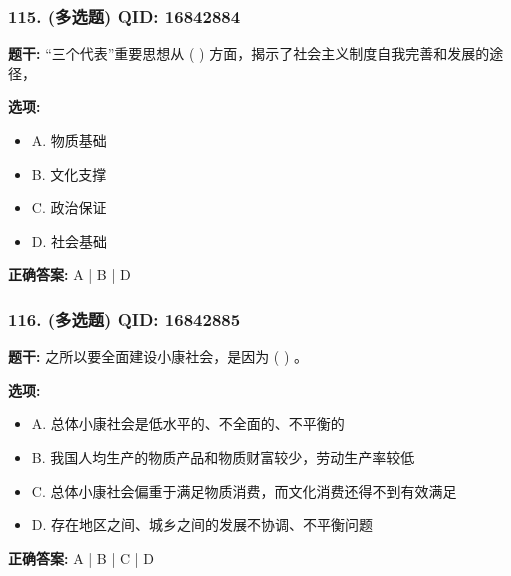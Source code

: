 \documentclass[12pt,UTF8]{ctexart}
\begin{document}
\subsubsection*{115. (多选题) \small QID: 16842884}

\textbf{题干:}
“三个代表”重要思想从 ( ) 方面，揭示了社会主义制度自我完善和发展的途径，

\textbf{选项:}
\begin{itemize}[leftmargin=*]

  \item A. 物质基础

  \item B. 文化支撑

  \item C. 政治保证

  \item D. 社会基础

\end{itemize}

\textbf{正确答案:}
A | B | D

\vspace{0.3em}\hrulefill\vspace{0.7em}

\subsubsection*{116. (多选题) \small QID: 16842885}

\textbf{题干:}
之所以要全面建设小康社会，是因为 ( ) 。

\textbf{选项:}
\begin{itemize}[leftmargin=*]

  \item A. 总体小康社会是低水平的、不全面的、不平衡的

  \item B. 我国人均生产的物质产品和物质财富较少，劳动生产率较低

  \item C. 总体小康社会偏重于满足物质消费，而文化消费还得不到有效满足

  \item D. 存在地区之间、城乡之间的发展不协调、不平衡问题

\end{itemize}

\textbf{正确答案:}
A | B | C | D

\vspace{0.3em}\hrulefill\vspace{0.7em}
\end{document}
